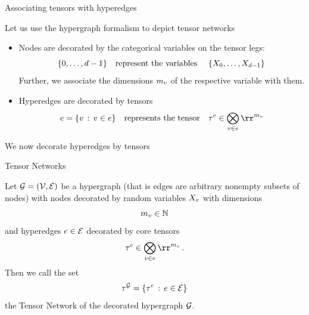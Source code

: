\documentclass{beamer}
\begin{document}
\begin{frame}{Associating tensors with hyperedges}

Let us use the hypergraph formalism to depict tensor networks
\begin{itemize}
	\item Nodes are decorated by the categorical variables on the tensor legs:
		\[  \{0,\ldots,d-1\} \quad \text{represent the variables } \quad \{X_{0},\ldots,X_{d-1}\}\]
		Further, we associate the dimensions $m_{v}$ of the respective variable with them.
	\item Hyperedges are decorated by tensors 
		\[ \edge = \{\node \, : \, \node \in \edge \} \quad \text{represents the tensor} \quad \hypercoreof{\edge} \in \bigotimes_{\node\in\edge} \rr^{\catdimof{\node}}\]
\end{itemize}

We now decorate hyperedges by tensors 
\begin{center}
	
\end{center}

\end{frame}



\begin{frame}{Tensor Networks}

\begin{definition}
	Let $\mathcal{G}=(\mathcal{V},\mathcal{E})$ be a hypergraph (that is edges are arbitrary nonempty subsets of nodes) with nodes decorated by random variables $X_{v}$ with dimensions
		\[ m_{v} \in \mathbb{N} \]	
	and hyperedges $e\in\mathcal{E}$ decorated by core tensors
		\[ \hypercoreof{\edge} \in \bigotimes_{\node\in\edge}\rr^{\catdimof{\node}} \, . \]
	Then we call the set 
		\[ \tau^{\mathcal{G}} = \{\tau^{e} \, : \, e\in\mathcal{E}\} \]
	the Tensor Network of the decorated hypergraph $\mathcal{G}$.
\end{definition}

\end{frame}
\end{document}
